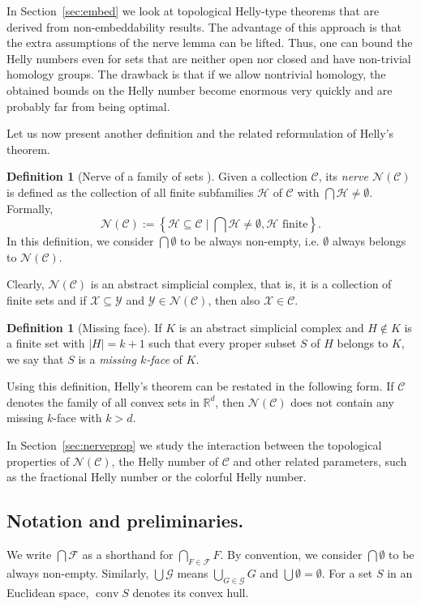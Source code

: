 \documentclass[a4paper,12pt]{amsart}
\newcommand{\R}{\mathbb{R}} 	%
\theoremstyle{definition}
\newtheorem{definition}[theorem]{Definition}
\begin{document}
In Section~\ref{sec:embed} we look at topological Helly-type theorems that are derived from non-embeddability results.
The advantage of this approach is that the extra assumptions of the nerve lemma can be lifted. Thus, one can bound the Helly numbers even for sets that are neither open nor closed and have non-trivial homology groups. 
The drawback is that if we allow nontrivial homology, the obtained bounds on the Helly number become enormous very quickly and are probably far from being optimal.

\bigskip

Let us now present another definition and the related reformulation of Helly's theorem.
\begin{definition}[Nerve of a family of sets \cite{nervedef}]
Given a collection $\mathcal C$,
its \emph{nerve $\mathcal N(\mathcal C)$}
is defined as the collection of all finite subfamilies $\mathcal H$ of $\mathcal C$
with $\bigcap\mathcal H\neq\emptyset$.
Formally,
\[
\mathcal N(\mathcal C):=\left \{\mathcal H\subseteq \mathcal C\mid \bigcap \mathcal H\neq \emptyset, \mathcal H\text{ finite}\right\}.
\]
In this definition, we consider $\bigcap \emptyset$ to be always non-empty, i.e. $\emptyset$ always belongs to $\mathcal N(\mathcal C)$.
\end{definition}
Clearly, $\mathcal N(\mathcal C)$ is an abstract simplicial complex, that is, it is a collection of finite sets and if $\mathcal X\subseteq\mathcal Y$ and $\mathcal Y\in\mathcal N(\mathcal C)$, then also $\mathcal X\in \mathcal C$.


\begin{definition}[Missing face]
If $K$ is an abstract simplicial complex
and $H\notin K$ is a finite set with $|H|=k+1$ such that every proper subset $S$ of $H$ belongs to $K$, we say that $S$ is a \emph{missing $k$-face} of $K$.
\end{definition}
Using this definition, Helly's theorem can be restated in the following form.
If $\mathcal C$ denotes the family of all convex sets in $\R^d$, then $\mathcal N(\mathcal C)$ does not contain any missing $k$-face with $k>d$.

In Section~\ref{sec:nerveprop} we study the interaction between the topological properties of $\mathcal N(\mathcal C)$, the Helly number of $\mathcal C$ and other related parameters, such as the fractional Helly number or the colorful Helly number.

\subsection*{Notation and preliminaries.}
We write $\bigcap \mathcal F$ as a shorthand for $\bigcap_{F \in \mathcal F} F$.  By convention, we consider $\bigcap\emptyset$ to be always non-empty.
Similarly, $\bigcup \mathcal G$ means $\bigcup_{G \in \mathcal G} G$ and $\bigcup \emptyset = \emptyset$. For a set $S$ in an Euclidean space, $\operatorname{conv} S$ denotes its convex hull.
\end{document}
